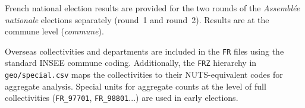 French national election results are provided for the two rounds of the
\textit{Assemblée nationale} elections separately (round~1 and round~2).
Results are at the commune level (\textit{commune}).

Overseas collectivities and departments are included in the \texttt{FR} files
using the standard INSEE commune coding.  Additionally, the \texttt{FRZ}
hierarchy in \texttt{geo/special.csv} maps the collectivities to their
NUTS-equivalent codes for aggregate analysis.
Special units for aggregate counts at the level of full collectivities
(\texttt{FR\_97701}, \texttt{FR\_98801}...) are used in early elections.